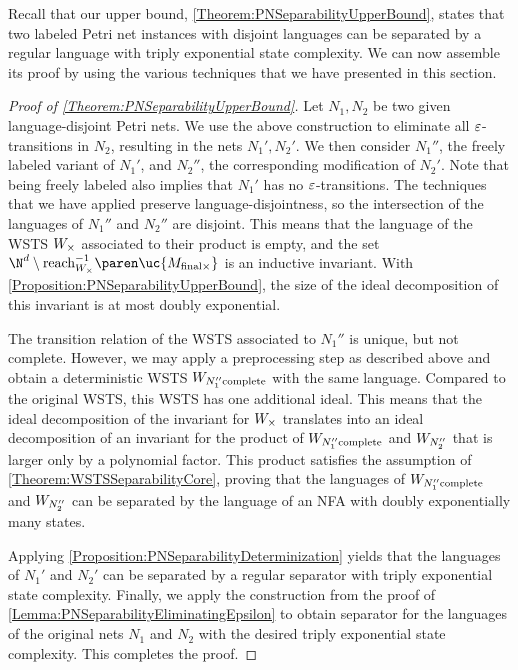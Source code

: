\documentclass[../../diss.tex]{subfiles}
\begin{document}
Recall that our upper bound, \cref{Theorem:PNSeparabilityUpperBound}, states that two labeled Petri net instances with disjoint languages can be separated by a regular language with triply exponential state complexity.
We can now assemble its proof by using the various techniques that we have presented in this section.

\begin{proof}[Proof of \cref{Theorem:PNSeparabilityUpperBound}]
    Let $N_1, N_2$ be two given language-disjoint Petri nets.
    We use the above construction to eliminate all $\varepsilon$-transitions in $N_2$, resulting in the nets $N_1',N_2'$.
    We then consider $N_1''$, the freely labeled variant of $N_1'$, and $N_2''$, the corresponding modification of $N_2'$.
    Note that being freely labeled also implies that $N_1'$ has no $\varepsilon$-transitions.
    The techniques that we have applied preserve language-disjointness, so the intersection of the languages of $N_1''$ and $N_2''$ are disjoint.
    This means that the language of the WSTS $W_\times$ associated to their product is empty, and the set $\N^d \setminus \reachrev{\wsts_\times}{\uc{M_{\final\times}}}$ is an inductive invariant.
    With \cref{Proposition:PNSeparabilityUpperBound}, the size of the ideal decomposition of this invariant is at most doubly exponential.

    The transition relation of the WSTS associated to $N_1''$ is unique, but not complete.
    However, we may apply a preprocessing step as described above and obtain a deterministic WSTS $W_{N_1''\text{complete}}$ with the same language.
    Compared to the original WSTS, this WSTS has one additional ideal.
    This means that the ideal decomposition of the invariant for $W_\times$ translates into an ideal decomposition of an invariant for the product of $W_{N_1''\text{complete}}$ and $W_{N_2''}$ that is larger only by a polynomial factor.
    This product satisfies the assumption of \cref{Theorem:WSTSSeparabilityCore}, proving that the languages of $W_{N_1''\text{complete}}$ and $W_{N_2''}$ can be separated by the language of an NFA with doubly exponentially many states.

    Applying \cref{Proposition:PNSeparabilityDeterminization} yields that the languages of $N_1'$ and $N_2'$ can be separated by a regular separator with triply exponential state complexity.
    Finally, we apply the construction from the proof of \cref{Lemma:PNSeparabilityEliminatingEpsilon} to obtain separator for the languages of the original nets $N_1$ and $N_2$ with the desired triply exponential state complexity.
    This completes the proof.
\end{proof}
\end{document}
